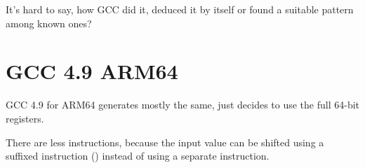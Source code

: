 It's hard to say, how GCC did it, deduced it by itself or found a suitable pattern among known ones?

\section{\Optimizing GCC 4.9 ARM64}

GCC 4.9 for ARM64 generates mostly the same, just decides to use the full 64-bit registers.

There are less instructions, because the input value can be shifted using a suffixed instruction ()
instead of using a separate instruction.


